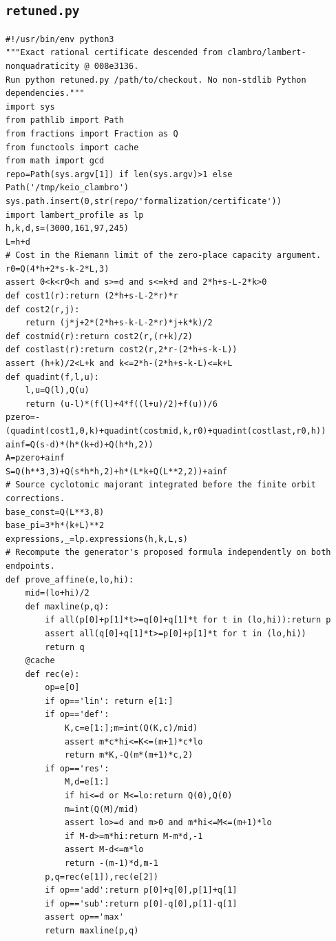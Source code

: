 \documentclass[11pt,a4paper]{article}
\begin{document}
\subsection*{\texttt{retuned.py}}
\begin{Verbatim}[fontsize=\footnotesize,breakanywhere=false]
#!/usr/bin/env python3
"""Exact rational certificate descended from clambro/lambert-nonquadraticity @ 008e3136.
Run python retuned.py /path/to/checkout. No non-stdlib Python dependencies."""
import sys
from pathlib import Path
from fractions import Fraction as Q
from functools import cache
from math import gcd
repo=Path(sys.argv[1]) if len(sys.argv)>1 else Path('/tmp/keio_clambro')
sys.path.insert(0,str(repo/'formalization/certificate'))
import lambert_profile as lp
h,k,d,s=(3000,161,97,245)
L=h+d
# Cost in the Riemann limit of the zero-place capacity argument.
r0=Q(4*h+2*s-k-2*L,3)
assert 0<k<r0<h and s>=d and s<=k+d and 2*h+s-L-2*k>0
def cost1(r):return (2*h+s-L-2*r)*r
def cost2(r,j):
    return (j*j+2*(2*h+s-k-L-2*r)*j+k*k)/2
def costmid(r):return cost2(r,(r+k)/2)
def costlast(r):return cost2(r,2*r-(2*h+s-k-L))
assert (h+k)/2<L+k and k<=2*h-(2*h+s-k-L)<=k+L
def quadint(f,l,u):
    l,u=Q(l),Q(u)
    return (u-l)*(f(l)+4*f((l+u)/2)+f(u))/6
pzero=-(quadint(cost1,0,k)+quadint(costmid,k,r0)+quadint(costlast,r0,h))
ainf=Q(s-d)*(h*(k+d)+Q(h*h,2))
A=pzero+ainf
S=Q(h**3,3)+Q(s*h*h,2)+h*(L*k+Q(L**2,2))+ainf
# Source cyclotomic majorant integrated before the finite orbit corrections.
base_const=Q(L**3,8)
base_pi=3*h*(k+L)**2
expressions,_=lp.expressions(h,k,L,s)
# Recompute the generator's proposed formula independently on both endpoints.
def prove_affine(e,lo,hi):
    mid=(lo+hi)/2
    def maxline(p,q):
        if all(p[0]+p[1]*t>=q[0]+q[1]*t for t in (lo,hi)):return p
        assert all(q[0]+q[1]*t>=p[0]+p[1]*t for t in (lo,hi))
        return q
    @cache
    def rec(e):
        op=e[0]
        if op=='lin': return e[1:]
        if op=='def':
            K,c=e[1:];m=int(Q(K,c)/mid)
            assert m*c*hi<=K<=(m+1)*c*lo
            return m*K,-Q(m*(m+1)*c,2)
        if op=='res':
            M,d=e[1:]
            if hi<=d or M<=lo:return Q(0),Q(0)
            m=int(Q(M)/mid)
            assert lo>=d and m>0 and m*hi<=M<=(m+1)*lo
            if M-d>=m*hi:return M-m*d,-1
            assert M-d<=m*lo
            return -(m-1)*d,m-1
        p,q=rec(e[1]),rec(e[2])
        if op=='add':return p[0]+q[0],p[1]+q[1]
        if op=='sub':return p[0]-q[0],p[1]-q[1]
        assert op=='max'
        return maxline(p,q)

\end{Verbatim}
\end{document}
